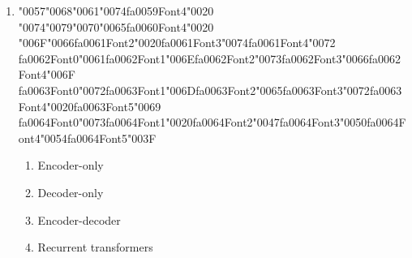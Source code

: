 \documentclass[12pt]{article}
\begin{document}
\begin{enumerate}[label=Q\arabic*.]
\begin{enumerate}[label=(\Alph*)]
    \item They require no training data
    \item They eliminate attention
    \item They only work for short sequences
    \item They preserve relative positions and generalize well
\end{enumerate}
\item {\char"0057}{\char"0068}{\char"0061}{\char"0074}{\csname fa0059Font4\endcsname\char"0020} {\char"0074}{\char"0079}{\char"0070}{\char"0065}{\csname fa0060Font4\endcsname\char"0020} {\char"006F}{\char"0066}{\csname fa0061Font2\endcsname\char"0020}{\csname fa0061Font3\endcsname\char"0074}{\csname fa0061Font4\endcsname\char"0072} {\csname fa0062Font0\endcsname\char"0061}{\csname fa0062Font1\endcsname\char"006E}{\csname fa0062Font2\endcsname\char"0073}{\csname fa0062Font3\endcsname\char"0066}{\csname fa0062Font4\endcsname\char"006F} {\csname fa0063Font0\endcsname\char"0072}{\csname fa0063Font1\endcsname\char"006D}{\csname fa0063Font2\endcsname\char"0065}{\csname fa0063Font3\endcsname\char"0072}{\csname fa0063Font4\endcsname\char"0020}{\csname fa0063Font5\endcsname\char"0069} {\csname fa0064Font0\endcsname\char"0073}{\csname fa0064Font1\endcsname\char"0020}{\csname fa0064Font2\endcsname\char"0047}{\csname fa0064Font3\endcsname\char"0050}{\csname fa0064Font4\endcsname\char"0054}{\csname fa0064Font5\endcsname\char"003F}
\begin{enumerate}[label=(\Alph*)]
    \item Encoder-only
    \item Decoder-only
    \item Encoder-decoder
    \item Recurrent transformers
\end{enumerate}

\end{enumerate}
\end{document}
